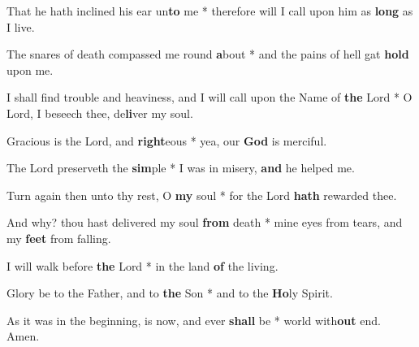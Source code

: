 \begin{multicols}{2}
	That he hath inclined his ear un\textbf{to} me * therefore will I call upon him as \textbf{long} as I live.
	
	The snares of death compassed me round \textbf{a}bout * and the pains of hell gat \textbf{hold} upon me.
	
	I shall find trouble and heaviness, and I will call upon the Name of \textbf{the} Lord * O Lord, I beseech thee, de\textbf{li}ver my soul.
	
	Gracious is the Lord, and \textbf{right}eous * yea, our \textbf{God} is merciful.
	
	The Lord preserveth the \textbf{sim}ple * I was in misery, \textbf{and} he helped me.
	
	Turn again then unto thy rest, O \textbf{my} soul * for the Lord \textbf{hath} rewarded thee.
	
	And why? thou hast delivered my soul \textbf{from} death * mine eyes from tears, and my \textbf{feet} from falling.
	
	I will walk before \textbf{the} Lord * in the land \textbf{of} the living.
	
	Glory be to the Father, and to \textbf{the} Son * and to the \textbf{Ho}ly Spirit.
	
	As it was in the beginning, is now, and ever \textbf{shall} be * world with\textbf{out} end. Amen.
\end{multicols}